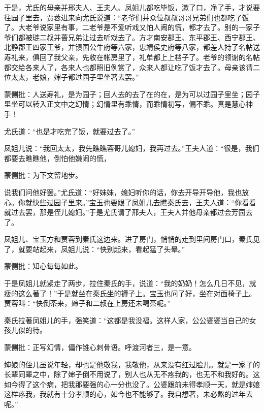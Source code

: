 \begin{parag}


    于是，尤氏的母亲并邢夫人、王夫人、凤姐儿都吃毕饭，漱了口，净了手，才说要往园子里去，贾蓉进来向尤氏说道：“老爷们并众位叔叔哥哥兄弟们也都吃了饭了。大老爷说家里有事，二老爷是不爱听戏又怕人闹的慌，都才去了。别的一家子爷们都被琏二叔并蔷兄弟让过去听戏去了。方才南安郡王、东平郡王、西宁郡王、北静郡王四家王爷，并镇国公牛府等六家，忠靖侯史府等八家，都差人持了名帖送寿礼来，俱回了我父亲，先收在帐房里了，礼单都上上档子了。老爷的领谢的名帖都交给各来人了，各来人也都照旧例赏了，众来人都让吃了饭才去了。母亲该请二位太太，老娘，婶子都过园子里坐著去罢。”\begin{note}蒙侧批：人送寿礼，是为园子；回人去的去了在的在，是为可以过园子里坐；园子里坐可以转入正文中之幻情；幻情里有乖情，而乖情初写，偏不乖。真是慧心神手！\end{note}尤氏道：“也是才吃完了饭，就要过去了。”
\end{parag}


\begin{parag}


    凤姐儿说：“我回太太，我先瞧瞧蓉哥儿媳妇，我再过去。”王夫人道：“很是，我们都要去瞧瞧他，倒怕他嫌闹的慌，\begin{note}蒙侧批：为下文留地步。\end{note}说我们问他好罢。”尤氏道：“好妹妹，媳妇听你的话，你去开导开导他，我也放心。你就快些过园子里来。”宝玉也要跟了凤姐儿去瞧秦氏去，王夫人道：“你看看就过去罢，那是侄儿媳妇。”于是尤氏请了邢夫人，王夫人并他母亲都过会芳园去了。
\end{parag}


\begin{parag}


    凤姐儿、宝玉方和贾蓉到秦氏这边来。进了房门，悄悄的走到里间房门口，秦氏见了，就要站起来，凤姐儿说：“快别起来，看起猛了头晕。”\begin{note}蒙侧批：知心每每如此。\end{note}于是凤姐儿就紧走了两步，拉住秦氏的手，说道：“我的奶奶！怎么几日不见，就瘦的这么著了！”于是就坐在秦氏坐的褥子上。宝玉也问了好，坐在对面椅子上。贾蓉叫：“快倒茶来，婶子和二叔在上房还未喝茶呢。”
\end{parag}


\begin{parag}


    秦氏拉著凤姐儿的手，强笑道：“这都是我没福。这样人家，公公婆婆当自己的女孩儿似的待。\begin{note}蒙侧批：正写幻情，偏作锥心刺骨语。呼渡河者三，是一意。\end{note}婶娘的侄儿虽说年轻，却也是他敬我，我敬他，从来没有红过脸儿。就是一家子的长辈同辈之中，除了婶子倒不用说了，别人也从无不疼我的，也无不和我好的。这如今得了这个病，把我那要强的心一分也没了。公婆跟前未得孝顺一天，就是婶娘这样疼我，我就有十分孝顺的心，如今也不能够了。我自想著，未必熬的过年去呢。”
\end{parag}


